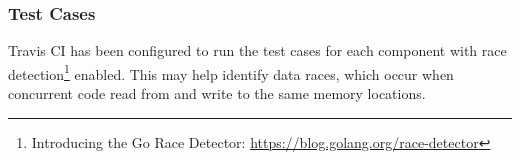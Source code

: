 
\subsubsection{Test Cases}

Travis CI has been configured to run the test cases for each component with race detection\footnote{Introducing the Go Race Detector: \url{https://blog.golang.org/race-detector}} enabled. This may help identify data races, which occur when concurrent code read from and write to the same memory locations.
